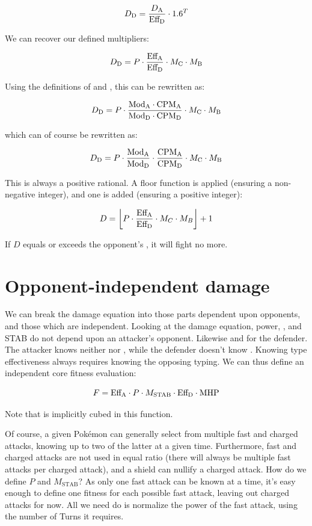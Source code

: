 \[ D_\mathrm{D} = \frac{D_\mathrm{A}}{\mbox{$\text{Eff}_\text{D}$}} \cdot 1.6^T \]

We can recover our defined multipliers:

\[ D_\mathrm{D} = P \cdot \frac{\mbox{$\text{Eff}_\text{A}$}}{\mbox{$\text{Eff}_\text{D}$}} \cdot M_\mathrm{C} \cdot M_\mathrm{B} \]

Using the definitions of  and , this can be rewritten as:

\[ D_\mathrm{D} = P \cdot \frac{\mbox{$\text{Mod}_\text{A}$} \cdot \mbox{CPM}_\mathrm{A}}{\mbox{$\text{Mod}_\text{D}$} \cdot \mbox{CPM}_\mathrm{D}} \cdot M_\mathrm{C} \cdot M_\mathrm{B} \]

which can of course be rewritten as:

\[ D_\mathrm{D} = P \cdot \frac{\mbox{$\text{Mod}_\text{A}$}}{\mbox{$\text{Mod}_\text{D}$}} \cdot \frac{\mbox{CPM}_\mathrm{A}}{\mbox{CPM}_\mathrm{D}} \cdot M_\mathrm{C} \cdot M_\mathrm{B} \]

This is always a positive rational.
A floor function is applied (ensuring a non-negative integer),
 and one is added (ensuring a positive integer):

\[ D = \left\lfloor P \cdot \frac{\mbox{$\text{Eff}_\text{A}$}}{\mbox{$\text{Eff}_\text{D}$}} \cdot M_C \cdot M_B \right\rfloor + 1 \]

If $D$ equals or exceeds the opponent's \HP, it will fight no more.

\section{Opponent-independent damage}
We can break the damage equation into those parts dependent upon opponents, and those which are independent.
Looking at the damage equation, power, , and STAB do not depend upon an attacker's opponent.
Likewise  and \MHP{} for the defender.
The attacker knows neither  nor \MHP, while the defender doesn't know .
Knowing type effectiveness always requires knowing the opposing typing.
We can thus define an independent core fitness evaluation:

\[ F = \mbox{$\text{Eff}_\text{A}$} \cdot P \cdot M_\mathrm{STAB} \cdot \mbox{$\text{Eff}_\text{D}$} \cdot \mbox{MHP} \]

Note that \CPM{} is implicitly cubed in this function.

Of course, a given Pokémon can generally select from multiple fast and charged attacks,
  knowing up to two of the latter at a given time.
Furthermore, fast and charged attacks are not used in equal ratio (there will
  always be multiple fast attacks per charged attack), and a shield can
  nullify a charged attack.
How do we define $P$ and $M_\mathrm{STAB}$?
As only one fast attack can be known at a time, it's easy enough to define one
  fitness for each possible fast attack, leaving out charged attacks for now.
All we need do is normalize the power of the fast attack, using the number of
  Turns it requires.

